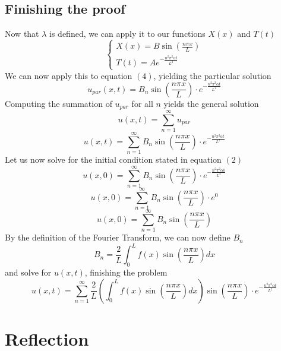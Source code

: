 \documentclass[a4paper]{article}
\begin{document}
        \subsection{Finishing the proof}
            Now that $\lambda$ is defined, we can apply it to our functions $X\left(x\right)$ and $T\left(t\right)$
            \[
                \begin{cases}
                    X\left(x\right) = B \sin\left(\frac{n \pi x}{L}\right) \\
                    T\left(t\right) = A e^{-\frac{n^{2} \pi^{2} \alpha t}{L^{2}}}
                \end{cases}
            \]
            We can now apply this to equation $\left(4\right)$, yielding the particular solution
            \[
                u_{par}\left(x,t\right) = B_{n} \sin\left(\frac{n \pi x}{L}\right) \cdot e^{-\frac{n^{2} \pi^{2} \alpha t}{L^{2}}}
            \]
            Computing the summation of $u_{par}$ for all $n$ yields the general solution
            \[
                u\left(x,t\right) = \sum_{n=1}^{\infty}{u_{par}}
            \]
            \[
                u\left(x,t\right) = \sum_{n=1}^{\infty}{B_{n} \sin\left(\frac{n \pi x}{L}\right) \cdot e^{-\frac{n^{2} \pi^{2} \alpha t}{L^{2}}}}
            \]
            Let us now solve for the initial condition stated in equation $\left(2\right)$
            \[
                u\left(x,0\right) = \sum_{n=1}^{\infty}{B_{n} \sin\left(\frac{n \pi x}{L}\right) \cdot e^{-\frac{n^{2} \pi^{2} \alpha 0}{L^{2}}}}
            \]
            \[
                u\left(x,0\right) = \sum_{n=1}^{\infty}{B_{n} \sin\left(\frac{n \pi x}{L}\right) \cdot e^{0}}
            \]
            \[
                u\left(x,0\right) = \sum_{n=1}^{\infty}{B_{n} \sin\left(\frac{n \pi x}{L}\right)}
            \]
            By the definition of the Fourier Transform, we can now define $B_{n}$
            \[
                B_{n} = \frac{2}{L} \int_{0}^{L}{f\left(x\right) \sin\left(\frac{n \pi x}{L}\right)} dx
            \]
            and solve for $u\left(x,t\right)$, finishing the problem
            \[
                u\left(x,t\right) = \sum_{n=1}^{\infty}{\frac{2}{L} \left(\int_{0}^{L}{f\left(x\right) \sin\left(\frac{n \pi x}{L}\right)} dx\right) \sin\left(\frac{n \pi x}{L}\right) \cdot e^{-\frac{n^{2} \pi^{2} \alpha t}{L^{2}}}}
            \]


    \section{Reflection}

        \vfill


    \nocite{fourierj}
    \printbibliography
\end{document}
